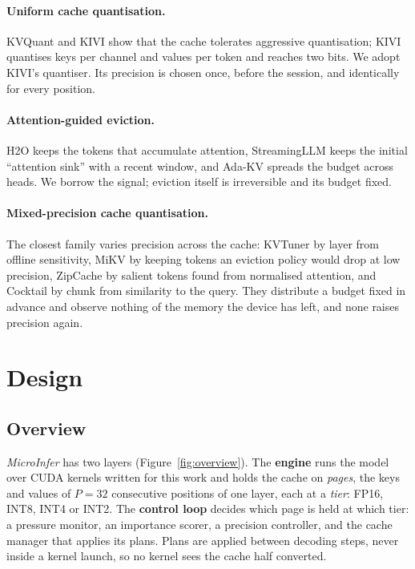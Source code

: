 \documentclass{article}
\begin{document}
\paragraph{Uniform cache quantisation.} KVQuant \cite{hooper2024kvquant} and
KIVI \cite{liu2024kivi} show that the cache tolerates aggressive quantisation;
KIVI quantises keys per channel and values per token and reaches two bits. We
adopt KIVI's quantiser. Its precision is chosen once, before the session, and
identically for every position.

\paragraph{Attention-guided eviction.} H2O \cite{zhang2023h2o} keeps the tokens
that accumulate attention, StreamingLLM \cite{xiao2024streamingllm} keeps the
initial ``attention sink'' with a recent window, and Ada-KV
\cite{feng2024adakv} spreads the budget across heads. We borrow the signal;
eviction itself is irreversible and its budget fixed.

\paragraph{Mixed-precision cache quantisation.} The closest family varies
precision across the cache: KVTuner \cite{kvtuner} by layer from offline
sensitivity, MiKV \cite{yang2024mikv} by keeping tokens an eviction policy would
drop at low precision, ZipCache \cite{he2024zipcache} by salient tokens found
from normalised attention, and Cocktail \cite{tao2025cocktail} by chunk from
similarity to the query. They distribute a budget fixed in advance and observe
nothing of the memory the device has left, and none raises precision again.

\section{Design}
\label{sec:design}

\subsection{Overview}
\label{sec:overview}

\textit{MicroInfer} has two layers (Figure~\ref{fig:overview}). The
\textbf{engine} runs the model over CUDA kernels written for this work and
holds the cache on \textit{pages}, the keys and values of $P = 32$ consecutive
positions of one layer, each at a \textit{tier}: FP16, INT8, INT4 or INT2. The
\textbf{control loop} decides which page is held at which tier: a pressure
monitor, an importance scorer, a precision controller, and the cache manager
that applies its plans. Plans are applied between decoding steps, never inside
a kernel launch, so no kernel sees the cache half converted.
\end{document}
